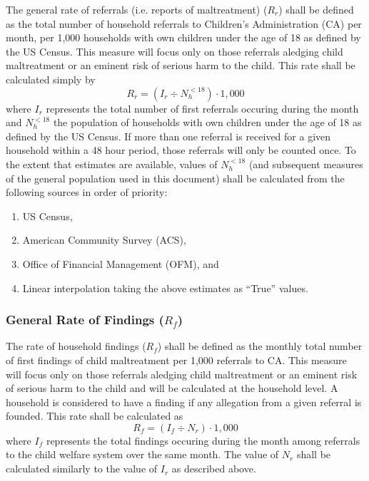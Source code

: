 \documentclass[12pt]{article}\usepackage[]{graphicx}\usepackage[]{color}
\begin{document}
The general rate of referrals (i.e. reports of maltreatment) ($R_r$) shall be defined as the total number of household referrals to Children's Administration (CA) per month, per 1,000 households with own children under the age of 18 as defined by the US Census. This measure will focus only on those referrals aledging child maltreatment or an eminent risk of serious harm to the child. This rate shall be calculated simply by 
\begin{equation}\label{eq:Rr}
R_r = (I_r \div N_{h}^{<18}) \cdot 1,000
\end{equation}
where $I_r$ represents the total number of first referrals occuring during the month and $N_{h}^{<18}$ the population of households with own children under the age of 18 as defined by the US Census. If more than one referral is received for a given household within a 48 hour period, those referrals will only be counted once. To the extent that estimates are available, values of $N_{h}^{<18}$ (and subsequent measures of the general population used in this document) shall be calculated from the following sources in order of priority:

\begin{enumerate}
  \item US Census,
  \item American Community Survey (ACS), 
  \item Office of Financial Management (OFM), and 
  \item Linear interpolation taking the above estimates as ``True'' values. 
\end{enumerate}

\subsubsection{General Rate of Findings ($R_f$)}

The rate of household findings ($R_f$) shall be defined as the monthly total number of first findings of child maltreatment per 1,000 referrals to CA. This measure will focus only on those referrals aledging child maltreatment or an eminent risk of serious harm to the child and will be calculated at the household level. A household is considered to have a finding if any allegation from a given referral is founded. This rate shall be calculated as 
\begin{equation}\label{eq:Rf}
R_f = (I_f \div N_r) \cdot 1,000
\end{equation}
where $I_f$ represents the total findings occuring during the month among referrals to the child welfare system over the same month. The value of $N_r$ shall be calculated similarly to the value of $I_r$ as described above. 
\end{document}
